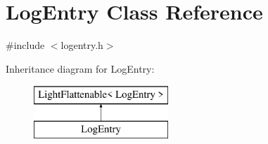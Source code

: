 \hypertarget{classLogEntry}{}\section{Log\+Entry Class Reference}
\label{classLogEntry}


{\ttfamily \#include $<$logentry.\+h$>$}

Inheritance diagram for Log\+Entry\+:\begin{figure}[H]
\begin{center}
\leavevmode
\includegraphics[height=2.000000cm]{classLogEntry}
\end{center}
\end{figure}
